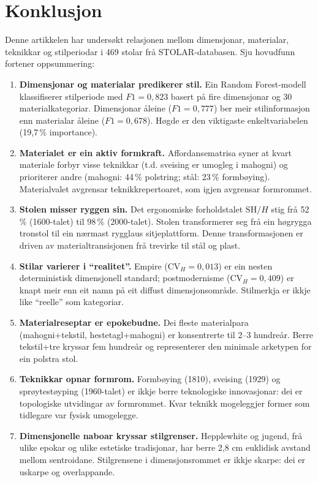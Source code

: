 \documentclass[10pt, a4paper, twocolumn]{article}
\begin{document}
\section{Konklusjon}

Denne artikkelen har undersøkt relasjonen mellom dimensjonar, materialar, teknikkar og stilperiodar i 469 stolar frå STOLAR-databasen. Sju hovudfunn fortener oppsummering:

\begin{enumerate}
  \item \textbf{Dimensjonar og materialar predikerer stil.} Ein Random Forest-modell klassifiserer stilperiode med $F1 = 0{,}823$ basert på fire dimensjonar og 30 materialkategoriar. Dimensjonar åleine ($F1 = 0{,}777$) ber meir stilinformasjon enn materialar åleine ($F1 = 0{,}678$). Høgde er den viktigaste enkeltvariabelen (19,7\,\% importance).

  \item \textbf{Materialet er ein aktiv formkraft.} Affordansematrisa syner at kvart materiale forbyr visse teknikkar (t.d. sveising er umogleg i mahogni) og prioriterer andre (mahogni: 44\,\% polstring; stål: 23\,\% formbøying). Materialvalet avgrensar teknikkrepertoaret, som igjen avgrensar formrommet.

  \item \textbf{Stolen misser ryggen sin.} Det ergonomiske forholdstalet $\text{SH}/H$ stig frå 52\,\% (1600-talet) til 98\,\% (2000-talet). Stolen transformerer seg frå ein høgrygga tronstol til ein nærmast rygglaus sitjeplattform. Denne transformasjonen er driven av materialtransisjonen frå trevirke til stål og plast.

  \item \textbf{Stilar varierer i ``realitet''.} Empire ($\text{CV}_H = 0{,}013$) er ein nesten deterministisk dimensjonell standard; postmodernisme ($\text{CV}_H = 0{,}409$) er knapt meir enn eit namn på eit diffust dimensjonsområde. Stilmerkja er ikkje like ``reelle'' som kategoriar.

  \item \textbf{Materialreseptar er epokebudne.} Dei fleste materialpara (mahogni+tekstil, hestetagl+mahogni) er konsentrerte til 2--3 hundreår. Berre tekstil+tre kryssar fem hundreår og representerer den minimale arketypen for ein polstra stol.

  \item \textbf{Teknikkar opnar formrom.} Formbøying (1810), sveising (1929) og sprøytestøyping (1960-talet) er ikkje berre teknologiske innovasjonar: dei er topologiske utvidingar av formrommet. Kvar teknikk mogeleggjer former som tidlegare var fysisk umogelegge.

  \item \textbf{Dimensjonelle naboar kryssar stilgrenser.} Hepplewhite og jugend, frå ulike epokar og ulike estetiske tradisjonar, har berre 2,8 cm euklidisk avstand mellom sentroidane. Stilgrensene i dimensjonsrommet er ikkje skarpe: dei er uskarpe og overlappande.
\end{enumerate}
\end{document}
